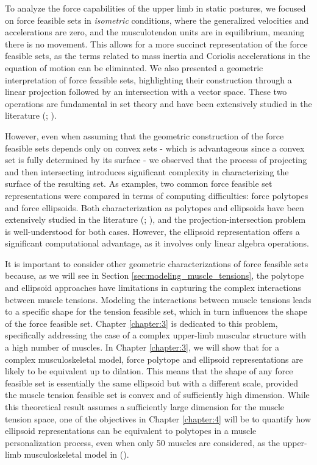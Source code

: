 To analyze the force capabilities of the upper limb in static postures, we focused on force feasible sets in \emph{isometric} conditions, where the generalized velocities and accelerations are zero, and the musculotendon units are in equilibrium, meaning there is no movement. This allows for a more succinct representation of the force feasible sets, as the terms related to mass inertia and Coriolis accelerations in the equation of motion can be eliminated. We also presented a geometric interpretation of force feasible sets, highlighting their construction through a linear projection followed by an intersection with a vector space. These two operations are fundamental in set theory and have been extensively studied in the literature (\cite{bourbakiTheorieEnsembles2006}; \cite{dorstGeometricAlgebraComputer2007}).

However, even when assuming that the geometric construction of the force feasible sets depends only on convex sets - which is advantageous since a convex set is fully determined by its surface - we observed that the process of projecting and then intersecting introduces significant complexity in characterizing the surface of the resulting set. As examples, two common force feasible set representations were compared in terms of computing difficulties: force polytopes and force ellipsoids. Both characterization as polytopes and ellipsoids have been extensively studied in the literature (\cite{grunbaumConvexPolytopes2013}; \cite{artstein-avidanAsymptoticGeometricAnalysis2015}), and the projection-intersection problem is well-understood for both cases. However, the ellipsoid representation offers a significant computational advantage, as it involves only linear algebra operations.

It is important to consider other geometric characterizations of force feasible sets because, as we will see in Section \ref{sec:modeling_muscle_tensions}, the polytope and ellipsoid approaches have limitations in capturing the complex interactions between muscle tensions. Modeling the interactions between muscle tensions leads to a specific shape for the tension feasible set, which in turn influences the shape of the force feasible set. Chapter \ref{chapter:3} is dedicated to this problem, specifically addressing the case of a complex upper-limb muscular structure with a high number of muscles. In Chapter \ref{chapter:3}, we will show that for a complex musculoskeletal model, force polytope and ellipsoid representations are likely to be equivalent up to dilation. This means that the shape of any force feasible set is essentially the same ellipsoid but with a different scale, provided the muscle tension feasible set is convex and of sufficiently high dimension. While this theoretical result assumes a sufficiently large dimension for the muscle tension space, one of the objectives in Chapter \ref{chapter:4} will be to quantify how ellipsoid representations can be equivalent to polytopes in a muscle personalization process, even when only 50 muscles are considered, as the upper-limb musculoskeletal model in (\cite{holzbaurModelUpperExtremity2005}).

